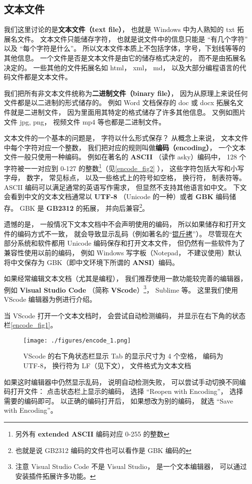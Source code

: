 
\subsection{文本文件}
我们这里讨论的是\textbf{文本文件（text file）}， 也就是 Windows 中为人熟知的 txt 拓展名文件。 文本文件只能储存字符， 也就是说文件中的信息只能是 “有几个字符” 以及 “每个字符是什么”。 所以文本文件本质上不包括字体，字号，下划线等等的其他信息。 一个文件是否是文本文件是由它的储存格式决定的， 而不是由拓展名决定的。 一些其他的文件拓展名如 html， xml， md， 以及大部分编程语言的代码文件都是文本文件。

我们把所有非文本文件统称为\textbf{二进制文件（binary file）}， 因为从原理上来说任何文件都是以二进制的形式储存的。 例如 Word 文档保存的 doc 或 docx 拓展名文件就是二进制文件， 因为里面用其特定的格式储存了许多其他信息。  又例如图片文件 jpg, png， 视频文件 mp4 等也都是二进制文件。

文本文件的一个基本的问题是， 字符以什么形式保存？ 从概念上来说， 文本文件中每个字符对应一个整数， 我们把对应的规则叫做\textbf{编码（encoding）}， 一个文本文件一般只使用一种编码。 例如在著名的 \textbf{ASCII} （读作 asky）编码中， 128 个字符被一一对应到 0-127 的整数\footnote{另外有 \textbf{extended ASCII} 编码对应 0-255 的整数}（见\autoref{encode_fig2} ）， 这些字符包括大写和小写字母， 数字， 常见标点， 以及一些格式上的符号如空格， 换行符， 制表符等。 ASCII 编码可以满足通常的英语写作需求， 但显然不支持其他语言如中文。 下文会看到中文的文本文档通常以 \textbf{UTF-8} （Unicode 的一种）或者 \textbf{GBK} 编码储存。 GBK 是 \textbf{GB2312} 的拓展， 并向后兼容\footnote{也就是说 GB2312 编码的文件也可以看作是 GBK 编码的}。

遗憾的是， 一般情况下文本文档中不会声明使用的编码， 所以如果储存和打开文件的编码方式不一致， 就会导致显示乱码（例如著名的“\href{https://baike.baidu.com/item/锟斤拷}{锟斤拷}”）。 尽管现在大部分系统和软件都用 Unicode 编码保存和打开文本文件， 但仍然有一些软件为了兼容性使用以前的编码， 例如 Windows 写字板（Notepad， 不建议使用）默认将中文保存为 GBK（即中文环境下所谓的 \textbf{ANSI}）编码。

如果经常编辑文本文档（尤其是编程）， 我们推荐使用一款功能较完善的编辑器， 例如 \textbf{Visual Studio Code} （简称 \textbf{VScode}）\footnote{注意 Visual Studio Code 不是 Visual Studio， 是一个文本编辑器， 可以通过安装插件拓展许多功能。}， Sublime 等。 这里我们使用 VScode 编辑器为例进行介绍。

当 VScode 打开一个文本文档时， 会尝试自动检测编码， 并显示在右下角的状态栏\autoref{encode_fig1}。
\begin{figure}[ht]
\centering
\texttt{[image: ./figures/encode\_1.png]}
\caption{VScode 的右下角状态栏显示 Tab 的显示尺寸为 4 个空格， 编码为 UTF-8， 换行符为 LF（见下文）， 文件格式为文本文档} \label{encode_fig1}
\end{figure}
如果这时编辑器中仍然显示乱码， 说明自动检测失败， 可以尝试手动切换不同编码打开文件： 点击状态栏上显示的编码， 选择 “Reopen with Encoding”， 选择需要的编码即可。 以正确的编码打开后， 如果想改为别的编码， 就选 “Save with Encoding”。

